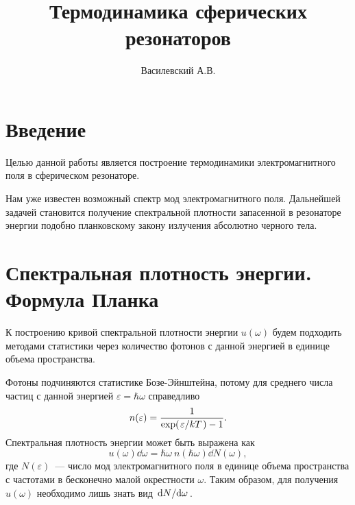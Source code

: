 \documentclass[12pt,a4paper]{article}
\title{Термодинамика сферических резонаторов}
\author{Василевский А.В.}
\begin{document}
    \maketitle
    \tableofcontents


    \section*{Введение}

        Целью данной работы является построение термодинамики электромагнитного поля в сферическом резонаторе.

        Нам уже известен возможный спектр мод электромагнитного поля. Дальнейшей задачей становится получение спектральной плотности запасенной в резонаторе энергии подобно планковскому закону излучения абсолютно черного тела.


    \section{Спектральная плотность энергии. Формула Планка}

        К построению кривой спектральной плотности энергии $u(\omega)$ будем подходить методами статистики через количество фотонов с данной энергией в единице объема пространства.

        Фотоны подчиняются статистике Бозе-Эйнштейна, потому для среднего числа частиц с данной энергией $\varepsilon = \hbar \omega$ справедливо
        \begin{equation}
            n(\varepsilon) = \frac{1}{\exp(\flatfrac{\varepsilon}{kT}) - 1} .
        \end{equation}
        Спектральная плотность энергии может быть выражена как
        \begin{equation}\label{eq:psd}
            u(\omega) \dd{\omega} = \hbar\omega\ n(\hbar\omega) \dd{N(\omega)} ,
        \end{equation}
        где $N(\varepsilon)$~--- число мод электромагнитного поля в единице объема пространства с частотами в бесконечно малой окрестности $\omega$. Таким образом, для получения $u(\omega)$ необходимо лишь знать вид $\dv*{N}{\omega}$.
\end{document}
